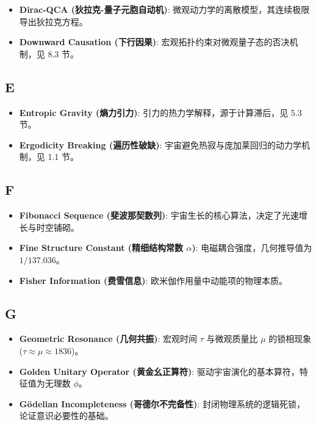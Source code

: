 \begin{itemize}
\item \textbf{Dirac-QCA (狄拉克-量子元胞自动机)}: 微观动力学的离散模型，其连续极限导出狄拉克方程。
\item \textbf{Downward Causation (下行因果)}: 宏观拓扑约束对微观量子态的否决机制，见 8.3 节。
\end{itemize}

\subsection{E}

\begin{itemize}
\item \textbf{Entropic Gravity (熵力引力)}: 引力的热力学解释，源于计算滞后，见 5.3 节。
\item \textbf{Ergodicity Breaking (遍历性破缺)}: 宇宙避免热寂与庞加莱回归的动力学机制，见 1.1 节。
\end{itemize}

\subsection{F}

\begin{itemize}
\item \textbf{Fibonacci Sequence (斐波那契数列)}: 宇宙生长的核心算法，决定了光速增长与时空铺砌。
\item \textbf{Fine Structure Constant (精细结构常数 $\alpha$)}: 电磁耦合强度，几何推导值为 $1/137.036$。
\item \textbf{Fisher Information (费雪信息)}: 欧米伽作用量中动能项的物理本质。
\end{itemize}

\subsection{G}

\begin{itemize}
\item \textbf{Geometric Resonance (几何共振)}: 宏观时间 $\tau$ 与微观质量比 $\mu$ 的锁相现象 ($\tau \approx \mu \approx 1836$)。
\item \textbf{Golden Unitary Operator (黄金幺正算符)}: 驱动宇宙演化的基本算符，特征值为无理数 $\phi$。
\item \textbf{Gödelian Incompleteness (哥德尔不完备性)}: 封闭物理系统的逻辑死锁，论证意识必要性的基础。
\end{itemize}

